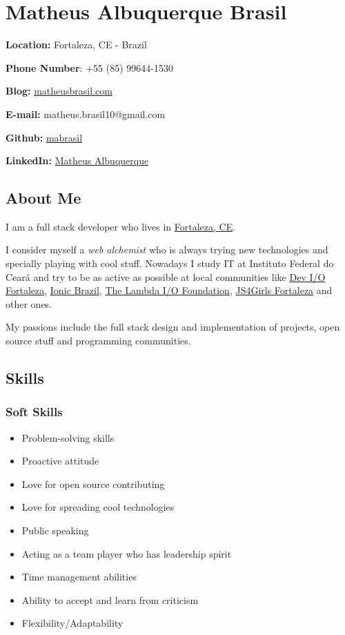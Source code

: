 \documentclass[]{article}
\date{}
\providecommand{\tightlist}{%
  \setlength{\itemsep}{0pt}\setlength{\parskip}{0pt}}
\begin{document}
\section{Matheus Albuquerque Brasil}\label{matheus-albuquerque-brasil}

\textbf{Location:} Fortaleza, CE - Brazil

\textbf{Phone Number}: +55 (85) 99644-1530

\textbf{Blog:} \href{http://matheusbrasil.com}{matheusbrasil.com}

\textbf{E-mail:} matheus.brasil10@gmail.com

\textbf{Github:} \href{https://github.com/mabrasil}{mabrasil}

\textbf{LinkedIn:}
\href{https://www.linkedin.com/in/matheusalbuquerque}{Matheus
Albuquerque}

\subsection{About Me}\label{about-me}

I am a full stack developer who lives in
\href{http://pt.wikipedia.org/wiki/Fortaleza}{Fortaleza, CE}.

I consider myself a \emph{web alchemist} who is always trying new
technologies and specially playing with cool stuff. Nowadays I study IT
at Instituto Federal do Ceará and try to be as active as possible at
local communities like
\href{https://www.facebook.com/groups/fortalezadevelopers/}{Dev I/O
Fortaleza}, \href{http://ionicbrazil.com/}{Ionic Brazil},
\href{https://github.com/lambda-io}{The Lambda I/O Foundation},
\href{http://js4girls-fortaleza.github.io/}{JS4Girls Fortaleza} and
other ones.

My passions include the full stack design and implementation of
projects, open source stuff and programming communities.

\subsection{Skills}\label{skills}

\subsubsection{Soft Skills}\label{soft-skills}

\begin{itemize}
\tightlist
\item
  Problem-solving skills
\item
  Proactive attitude
\item
  Love for open source contributing
\item
  Love for spreading cool technologies
\item
  Public speaking
\item
  Acting as a team player who has leadership spirit
\item
  Time management abilities
\item
  Ability to accept and learn from criticism
\item
  Flexibility/Adaptability
\end{itemize}
\end{document}
